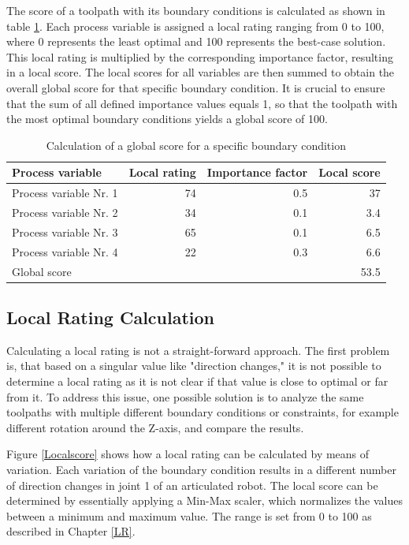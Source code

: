 The score of a toolpath with its boundary conditions is calculated as shown in table \ref{weighting}. Each process variable is assigned a local rating ranging from 0 to 100, where 0 represents the least optimal and 100 represents the best-case solution. This local rating is multiplied by the corresponding importance factor, resulting in a local score. The local scores for all variables are then summed to obtain the overall global score for that specific boundary condition. It is crucial to ensure that the sum of all defined importance values equals 1, so that the toolpath with the most optimal boundary conditions yields a global score of 100.

\begin{table}[H]
	\centering
	\begin{tabular}{||l|r|r|r||}
		Process variable & Local rating & Importance factor& Local score\\
		\hline
		\hline
		\hline
		
		Process variable Nr. 1 & 74 & 0.5 & 37\\
		Process variable Nr. 2 & 34& 0.1&3.4\\
		Process variable Nr. 3 & 65& 0.1&6.5\\
		Process variable Nr. 4 & 22&0.3&6.6\\
		\hline
		\hline
		\hline
		Global score& & &53.5\\
		\hline
		\hline
	\end{tabular}
	
	\caption{Calculation of a global score for a specific boundary condition}
	\label{weighting}
\end{table}


\subsection{Local Rating Calculation}\label{LRC}
Calculating a local rating is not a straight-forward approach. The first problem is, that based on a singular value like "direction changes," it is not possible to determine a local rating as it is not clear if that value is close to optimal or far from it. To address this issue, one possible solution is to analyze the same toolpaths with multiple different boundary conditions or constraints, for example different rotation around the Z-axis, and compare the results.

Figure \ref{Localscore} shows how a local rating can be calculated by means of variation. Each variation of the boundary condition results in a different number of direction changes in joint 1 of an articulated robot. The local score can be determined by essentially applying a Min-Max scaler, which normalizes the values between a minimum and maximum value. The range is set from 0 to 100 as described in Chapter \ref{LR}.


